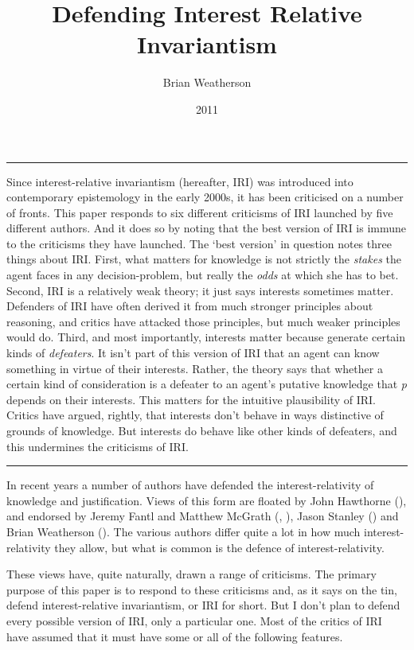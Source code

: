 \documentclass[
  10pt,
  letterpaper,
  DIV=11,
  numbers=noendperiod,
  twoside]{scrartcl}
\title{Defending Interest Relative Invariantism}
\author{Brian Weatherson}
\date{2011}
\renewenvironment{abstract}
 {\vspace{-1.25cm}
 \quotation\small\noindent\rule{\linewidth}{.5pt}\par\smallskip
 \noindent }
 {\par\noindent\rule{\linewidth}{.5pt}\endquotation}
\begin{document}
\maketitle
\begin{abstract}
Since interest-relative invariantism (hereafter, IRI) was introduced
into contemporary epistemology in the early 2000s, it has been
criticised on a number of fronts. This paper responds to six different
criticisms of IRI launched by five different authors. And it does so by
noting that the best version of IRI is immune to the criticisms they
have launched. The `best version' in question notes three things about
IRI. First, what matters for knowledge is not strictly the \emph{stakes}
the agent faces in any decision-problem, but really the \emph{odds} at
which she has to bet. Second, IRI is a relatively weak theory; it just
says interests sometimes matter. Defenders of IRI have often derived it
from much stronger principles about reasoning, and critics have attacked
those principles, but much weaker principles would do. Third, and most
importantly, interests matter because generate certain kinds of
\emph{defeaters}. It isn't part of this version of IRI that an agent can
know something in virtue of their interests. Rather, the theory says
that whether a certain kind of consideration is a defeater to an agent's
putative knowledge that \emph{p} depends on their interests. This
matters for the intuitive plausibility of IRI. Critics have argued,
rightly, that interests don't behave in ways distinctive of grounds of
knowledge. But interests do behave like other kinds of defeaters, and
this undermines the criticisms of IRI.
\end{abstract}


In recent years a number of authors have defended the
interest-relativity of knowledge and justification. Views of this form
are floated by John Hawthorne (), and
endorsed by Jeremy Fantl and Matthew McGrath
(, ),
Jason Stanley () and Brian
Weatherson (). The various
authors differ quite a lot in how much interest-relativity they allow,
but what is common is the defence of interest-relativity.

These views have, quite naturally, drawn a range of criticisms. The
primary purpose of this paper is to respond to these criticisms and, as
it says on the tin, defend interest-relative invariantism, or IRI for
short. But I don't plan to defend every possible version of IRI, only a
particular one. Most of the critics of IRI have assumed that it must
have some or all of the following features.
\end{document}

